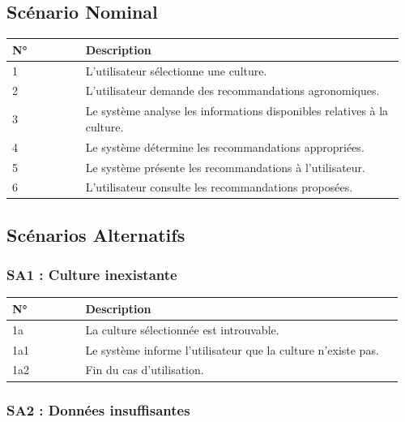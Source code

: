 \hypertarget{scuxe9nario-nominal-4}{%
\subsection{Scénario Nominal}\label{scuxe9nario-nominal-4}}

\begin{longtable}{@{}p{0.18\linewidth}p{0.78\linewidth}@{}}
\toprule
\rowcolors{2}{gray!10}{white}
\textbf{N°} & \textbf{Description} \\
\midrule
\endhead
1 & L'utilisateur sélectionne une culture. \\
2 & L'utilisateur demande des recommandations agronomiques. \\
3 & Le système analyse les informations disponibles relatives à la
culture. \\
4 & Le système détermine les recommandations appropriées. \\
5 & Le système présente les recommandations à l'utilisateur. \\
6 & L'utilisateur consulte les recommandations proposées. \\
\bottomrule
\end{longtable}

\hypertarget{scuxe9narios-alternatifs-4}{%
\subsection{Scénarios Alternatifs}\label{scuxe9narios-alternatifs-4}}

\hypertarget{sa1-culture-inexistante-2}{%
\subsubsection{SA1 : Culture
inexistante}\label{sa1-culture-inexistante-2}}

\begin{longtable}{@{}p{0.18\linewidth}p{0.78\linewidth}@{}}
\toprule
\rowcolors{2}{gray!10}{white}
\textbf{N°} & \textbf{Description} \\
\midrule
\endhead
1a & La culture sélectionnée est introuvable. \\
1a1 & Le système informe l'utilisateur que la culture n'existe pas. \\
1a2 & Fin du cas d'utilisation. \\
\bottomrule
\end{longtable}

\hypertarget{sa2-donnuxe9es-insuffisantes}{%
\subsubsection{SA2 : Données
insuffisantes}\label{sa2-donnuxe9es-insuffisantes}}

